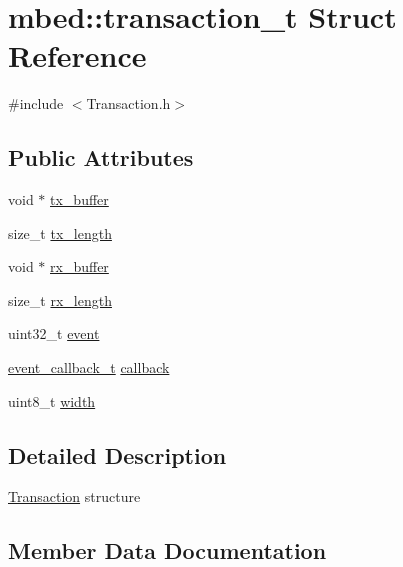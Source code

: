 \hypertarget{structmbed_1_1transaction__t}{}\section{mbed\+:\+:transaction\+\_\+t Struct Reference}
\label{structmbed_1_1transaction__t}


{\ttfamily \#include $<$Transaction.\+h$>$}

\subsection*{Public Attributes}
\begin{DoxyCompactItemize}
\item 
void $\ast$ \hyperlink{structmbed_1_1transaction__t_abacf8c4e26c5bee9e3f45abdb065a46c}{tx\+\_\+buffer}
\item 
size\+\_\+t \hyperlink{structmbed_1_1transaction__t_aa2251489b9b40afc9b6ee367d0c7746d}{tx\+\_\+length}
\item 
void $\ast$ \hyperlink{structmbed_1_1transaction__t_a56698177b98a193cdea584d5d9e83a51}{rx\+\_\+buffer}
\item 
size\+\_\+t \hyperlink{structmbed_1_1transaction__t_afefd7a94e22cadc29445edc25d33ff68}{rx\+\_\+length}
\item 
uint32\+\_\+t \hyperlink{structmbed_1_1transaction__t_ab833266b58930c495adc9ca6ca6ac6ee}{event}
\item 
\hyperlink{classmbed_1_1_function_pointer_arg1}{event\+\_\+callback\+\_\+t} \hyperlink{structmbed_1_1transaction__t_ac002693cf63d9a1a05789c966de5053d}{callback}
\item 
uint8\+\_\+t \hyperlink{structmbed_1_1transaction__t_a07ac843f6ce2f59a3d65d7d8beac1f11}{width}
\end{DoxyCompactItemize}


\subsection{Detailed Description}
\hyperlink{classmbed_1_1_transaction}{Transaction} structure 

\subsection{Member Data Documentation}
